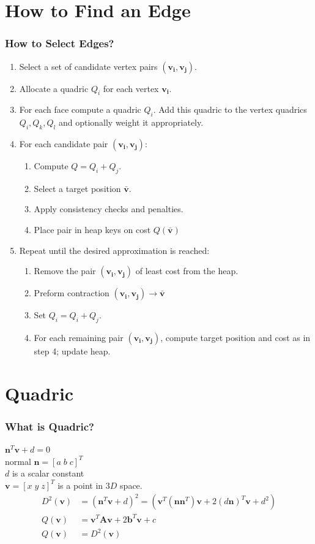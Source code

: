 \documentclass[
	10pt,
	t		%
]{beamer}
\begin{document}
\section{How to Find an Edge}
\begin{frame}
\frametitle{How to Select Edges?}
\centering
\begin{enumerate}
\item Select a set of candidate vertex pairs $(\mathbf{v_i}, \mathbf{v_j})$.
\item Allocate a quadric $Q_i$ for each vertex $\mathbf{v_i}$.
\item For each face compute a quadric $Q_i$. Add this quadric to the vertex quadrics $Q_i, Q_k, Q_l$ and optionally weight it appropriately.
\item For each candidate pair $(\mathbf{v_i}, \mathbf{v_j})$:
\begin{enumerate}
\item Compute $Q = Q_i + Q_j$.
\item Select a target position $\mathbf{\bar{v}}$.
\item Apply consistency checks and penalties.
\item Place pair in heap keys on cost $Q(\mathbf{\bar{v}})$
\end{enumerate}
\item Repeat until the desired approximation is reached:
\begin{enumerate}
\item Remove the pair $(\mathbf{v_i}, \mathbf{v_j})$ of least cost from the heap.
\item Preform contraction $(\mathbf{v_i}, \mathbf{v_j})\rightarrow\bar{\mathbf{v}}$
\item Set $Q_i = Q_i + Q_j$.
\item For each remaining pair $(\mathbf{v_i}, \mathbf{v_j})$, compute target position and cost as in step 4; update heap.
\end{enumerate}
\end{enumerate}
\end{frame}

\section{Quadric}
\begin{frame}
\frametitle{What is Quadric?}
\centering
$\mathbf{n}^T\mathbf{v}+d=0$\\ normal $\mathbf{n} = [a\;b\;c]^T$\\ $d$ is a scalar constant\\ $\mathbf{v} = [x\;y\;z]^T$ is a point in $3D$ space.
\\
\begin{align}
D^2(\mathbf{v}) &= (\mathbf{n}^T\mathbf{v}+d)^2 = (\mathbf{v}^T(\mathbf{n}\mathbf{n}^T)\mathbf{v}+2(d\mathbf{n})^T\mathbf{v}+d^2)\\
Q(\mathbf{v}) &= \mathbf{v}^T\mathbf{A}\mathbf{v} + 2\mathbf{b}^T\mathbf{v} + c\\
Q(\mathbf{v}) &= D^2(\mathbf{v})
\end{align}
\end{frame}
\end{document}
